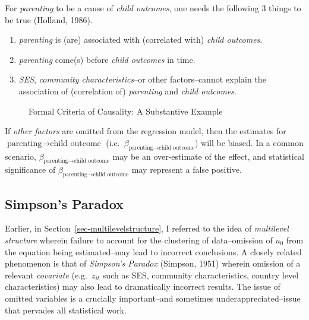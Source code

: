 \documentclass[
  letterpaper,
  DIV=11,
  numbers=noendperiod]{scrreprt}
\providecommand{\tightlist}{%
  \setlength{\itemsep}{0pt}\setlength{\parskip}{0pt}}\usepackage{longtable,booktabs,array}
\begin{document}
For \emph{parenting} to be a cause of \emph{child outcomes}, one needs
the following 3 things to be true (Holland, 1986).

\begin{enumerate}
\def\labelenumi{\arabic{enumi}.}
\tightlist
\item
  \emph{parenting} is (are) associated with (correlated with)
  \emph{child outcomes}.
\item
  \emph{parenting} come(s) before \emph{child outcomes} in time.
\item
  \emph{SES}, \emph{community characteristics}--or other factors--cannot
  explain the association of (correlation of) \emph{parenting} and
  \emph{child outcomes}.
\end{enumerate}

\begin{figure}


\caption{\label{fig-causalitysubstantive}Formal Criteria of Causality: A
Substantive Example}

\end{figure}%

If \emph{other factors} are omitted from the regression model, then the
estimates for \(\text{parenting} \rightarrow \text{child outcome}\)
(i.e.~\(\beta_{\text{parenting} \rightarrow \text{child outcome}}\))
will be biased. In a common scenario,
\(\beta_{\text{parenting} \rightarrow \text{child outcome}}\) may be an
over-estimate of the effect, and statistical significance of
\(\beta_{\text{parenting} \rightarrow \text{child outcome}}\) may
represent a false positive.

\subsection{Simpson's Paradox}\label{sec-Simpsons}

Earlier, in Section~\ref{sec-multilevelstructure}, I referred to the
idea of \emph{multilevel structure} wherein failure to account for the
clustering of data--omission of \(u_0\) from the equation being
estimated--may lead to incorrect conclusions. A closely related
phenomenon is that of \emph{Simpson's Paradox} (Simpson, 1951) wherein
omission of a relevant \emph{covariate} (e.g.~\(z_{it}\) such as SES,
community characteristics, country level characteristics) may also lead
to dramatically incorrect results. The issue of omitted variables is a
crucially important--and sometimes underappreciated--issue that pervades
all statistical work.
\end{document}
